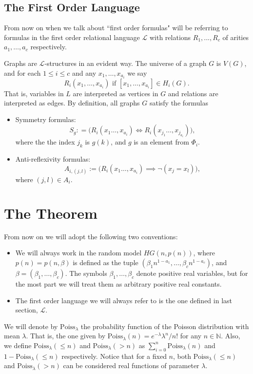 \documentclass[11pt,notitlepage,a4paper]{article}
\theoremstyle{definition}
\newcommand{\N}{\mathbb{N}}
\begin{document}
\subsection{The First Order Language}

From now on when we talk about ``first order formulas" 
will be referring to formulas in the first order relational 
language $\mathcal{L}$ with relations $R_1,..., R_c$ of arities
$a_1,\dots, a_c$ respectively. \par

Graphs are $\mathcal{L}$-structures in an evident way. 
The universe of a graph $G$ is $V(G)$, and for each 
$1\leq i \leq c$ and any $x_1,\dots, x_{a_i}$ we say 
\[R_i(x_1,\dots,x_{a_i}) \text{ if } [x_1,\dots, x_{a_i}]\in H_i(G).\] 
That is, variables in $L$ are interpreted as vertices in $G$ and
relations are interpreted as edges. By definition, all graphs $G$ 
satisfy the formulas
\begin{itemize}
	\item Symmetry formulas:
	\[ S_g: =\big( R_i(x_1\dots,x_{a_i})\iff R_i(x_{j_1}\dots,x_{j_{a_i}})\big) ,\]
	where the the index $j_k$ is $g(k)$, and $g$ is an element from $\Phi_i$.
	\item Anti-reflexivity formulas:
	\[A_{i,(j,l)}:=\big(R_i(x_1\dots,x_{a_i})\implies 
	\neg(x_j= x_l)\big),\]
	where $(j,l)\in A_i$.
\end{itemize}
 
\section{The Theorem}

From now on we will adopt the following two conventions:
\begin{itemize}
	\item We will always work in the random model $HG(n,p(n))$, where
	$p(n)=p(n,\beta)$ is defined as the tuple
	$(\beta_1 n^{1-a_1},\dots, \beta_c n^{1-a_c})$, and
	$\beta=(\beta_1,\dots, \beta_c)$.
	The symbols $\beta_1,\dots, \beta_c$
	denote positive real variables,
	but for the most part we will 
	treat them as arbitrary positive real constants.
	\item The first order language we will always refer to is the one 
	defined in last section, $\mathcal{L}$. 
\end{itemize}
 
We will denote by $\mathrm{Poiss}_\lambda$ the probability
function of the Poisson distribution with mean $\lambda$.
That is, the one given by $\mathrm{Poiss}_\lambda(n)=e^{-\lambda}\lambda^n/n!$ 
for any $n\in \N$.
Also, we define $\mathrm{Poiss}_\lambda(\leq n)$ and $\mathrm{Poiss}_\lambda(>n)$ as 
$\sum_{i=0}^n \mathrm{Poiss}_\lambda(n)$ and $1-\mathrm{Poiss}_\lambda(\leq n)$
respectively. Notice that for a fixed $n$, both $\mathrm{Poiss}_\lambda(\leq n)$ 
and $\mathrm{Poiss}_\lambda(>n)$ can be considered real functions of parameter $\lambda$. \par
\end{document}
